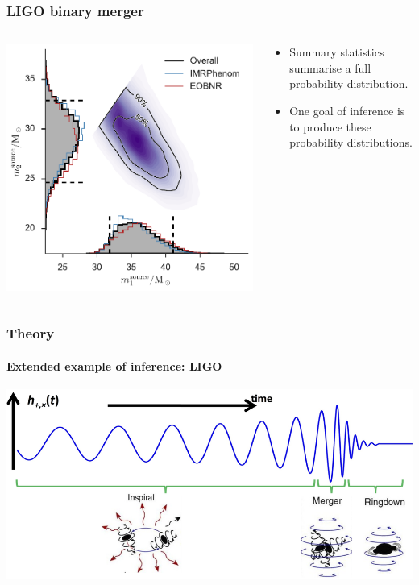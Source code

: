 \documentclass[%
]{beamer}
\begin{document}
\begin{frame}
    \frametitle{LIGO binary merger}
    \begin{columns}
        \begin{column}{0.65\textwidth}
            \includegraphics[width=\textwidth]{./figures/ligo_m1_m2.pdf}
        \end{column}
        \begin{column}{0.35\textwidth}
            \begin{itemize}
                \item Summary statistics summarise a full probability distribution.
                \item One goal of inference is to produce these probability distributions.
            \end{itemize}
        \end{column}
    \end{columns}
\end{frame}

\begin{frame}
    \frametitle{Theory}
    \framesubtitle{Extended example of inference: LIGO}
    \includegraphics[width=\textwidth]{./figures/ligo_schematic.png}
\end{frame}
\end{document}
